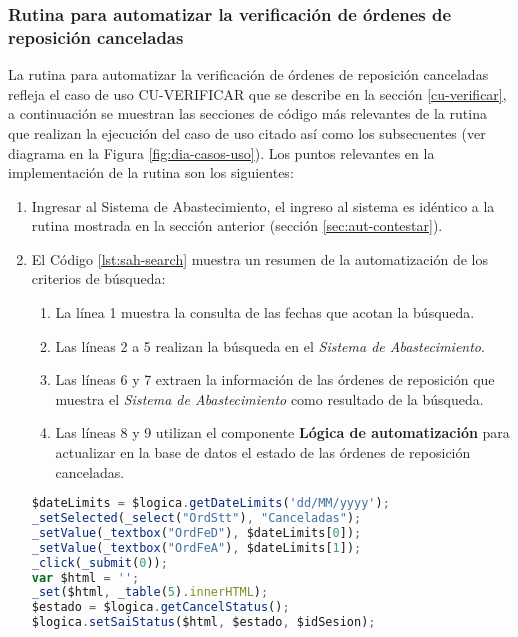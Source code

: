 \subsubsection{Rutina para automatizar la verificación de órdenes de reposición canceladas}
La rutina para automatizar la verificación de órdenes de reposición canceladas refleja el caso de uso  CU-VERIFICAR que se describe en la sección \ref{cu-verificar}, a continuación se muestran las secciones de código más relevantes de la rutina que realizan la ejecución del caso de uso citado así como los subsecuentes (ver diagrama en la Figura \ref{fig:dia-casos-uso}). Los puntos relevantes en la implementación de la rutina son los siguientes:
\begin{enumerate}
	\item Ingresar al Sistema de Abastecimiento, el ingreso al sistema es idéntico a la rutina mostrada en la sección anterior (sección \ref{sec:aut-contestar}).

	\item El Código \ref{lst:sah-search} muestra un resumen de la automatización de los criterios de búsqueda:
	\begin{enumerate}
		\item La línea 1 muestra la consulta de las fechas que acotan la búsqueda.
		\item Las líneas 2 a 5 realizan la búsqueda en el \textit{Sistema de Abastecimiento}.
		\item Las líneas 6 y 7 extraen la información de las órdenes de reposición que muestra el \textit{Sistema de Abastecimiento} como resultado de la búsqueda.
		\item Las líneas 8 y 9 utilizan el componente \textbf{Lógica de automatización} para actualizar en la base de datos el estado de las órdenes de reposición canceladas.
	\end{enumerate}
	\begin{lstlisting}[language=Javascript, caption={Responder orden de reposición.}, captionpos=b, label={lst:sah-search}]
$dateLimits = $logica.getDateLimits('dd/MM/yyyy');
_setSelected(_select("OrdStt"), "Canceladas");
_setValue(_textbox("OrdFeD"), $dateLimits[0]);
_setValue(_textbox("OrdFeA"), $dateLimits[1]);
_click(_submit(0));
var $html = '';
_set($html, _table(5).innerHTML);
$estado = $logica.getCancelStatus();
$logica.setSaiStatus($html, $estado, $idSesion);
	\end{lstlisting}
\end{enumerate}
